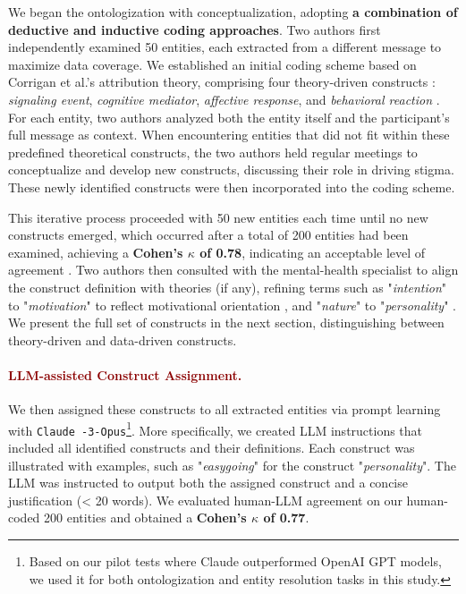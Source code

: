 We began the ontologization with conceptualization, adopting \textbf{a combination of deductive and inductive coding approaches}. 
Two authors first independently examined 50 entities, each extracted from a different message to maximize data coverage. 
We established an initial coding scheme based on Corrigan et al.'s attribution theory, comprising four theory-driven constructs \cite{hybrid_fereday_2006}: \textit{signaling event}, \textit{cognitive mediator}, \textit{affective response}, and \textit{behavioral reaction} \cite{attribution_theory_corrigan_2000}. 
For each entity, two authors analyzed both the entity itself and the participant's full message as context. 
When encountering entities that did not fit within these predefined theoretical constructs, the two authors held regular meetings to conceptualize and develop new constructs, discussing their role in driving stigma. 
These newly identified constructs were then incorporated into the coding scheme.

This iterative process proceeded with 50 new entities each time until no new constructs emerged, which occurred after a total of 200 entities had been examined, achieving a \textbf{Cohen's $\kappa$ of 0.78}, indicating an acceptable level of agreement \cite{cohens_kappa_mchugh_2012}.
Two authors then consulted with the mental-health specialist to align the construct definition with theories (if any), refining terms such as "\textit{intention}" to "\textit{motivation}" to reflect motivational orientation \cite{motivational_reviewer_kvaale_2016}, and "\textit{nature}" to "\textit{personality}" \cite{personality_reviewer_steiger_2022}.
We present the full set of constructs in the next section, distinguishing between theory-driven and data-driven constructs.


\paragraph{\textcolor{darkred}{\textbf{LLM-assisted Construct Assignment.}}}

We then assigned these constructs to all extracted entities via prompt learning with \texttt{Claude -3}\texttt{-Opus}\footnote{Based on our pilot tests where Claude outperformed OpenAI GPT models, we used it for both ontologization and entity resolution tasks in this study.}. 
More specifically, we created LLM instructions that included all identified constructs and their definitions. 
Each construct was illustrated with examples, such as "\textit{easygoing}" for the construct "\textit{personality}". 
The LLM was instructed to output both the assigned construct and a concise justification (< 20 words). 
We evaluated human-LLM agreement on our human-coded 200 entities and obtained a \textbf{Cohen's $\kappa$ of 0.77}.




